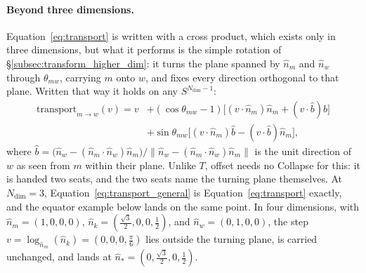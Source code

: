 \documentclass[12pt, a4paper]{article}
\begin{document}
\paragraph{Beyond three dimensions.}
Equation~\eqref{eq:transport} is written with a cross product, which
exists only in three dimensions, but what it performs is the simple
rotation of \S\ref{subsec:transform_higher_dim}: it turns the plane
spanned by $\hat n_m$ and $\hat n_w$ through $\theta_{mw}$, carrying
$m$ onto $w$, and fixes every direction orthogonal to that plane.
Written that way it holds on any $S^{N_{\mathrm{dim}}-1}$:
\begin{equation}
    \begin{aligned}
    \mathrm{transport}_{m\to w}(v)
    = v &+ (\cos\theta_{mw}-1)\bigl[(v\cdot\hat n_m)\hat n_m + (v\cdot\hat b)\hat b\bigr]\\
        &+ \sin\theta_{mw}\bigl[(v\cdot\hat n_m)\hat b - (v\cdot\hat b)\hat n_m\bigr],
    \end{aligned}
    \label{eq:transport_general}
\end{equation}
where $\hat b = \bigl(\hat n_w - (\hat n_m\cdot\hat n_w)\hat n_m\bigr)/
\lVert \hat n_w - (\hat n_m\cdot\hat n_w)\hat n_m\rVert$ is the unit
direction of $w$ as seen from $m$ within their plane.
Unlike $T$, offset needs no Collapse for this: it is handed two seats,
and the two seats name the turning plane themselves. At
$N_{\mathrm{dim}}=3$, Equation~\eqref{eq:transport_general} is
Equation~\eqref{eq:transport} exactly, and the equator example below
lands on the same point. In four dimensions, with
$\hat n_m=(1,0,0,0)$, $\hat n_k=(\tfrac{\sqrt3}{2},0,0,\tfrac12)$, and
$\hat n_w=(0,1,0,0)$, the step $v=\log_{\hat n_m}(\hat n_k)
=(0,0,0,\tfrac{\pi}{6})$ lies outside the turning plane, is carried
unchanged, and lands at $\hat n_*=(0,\tfrac{\sqrt3}{2},0,\tfrac12)$.
\end{document}
